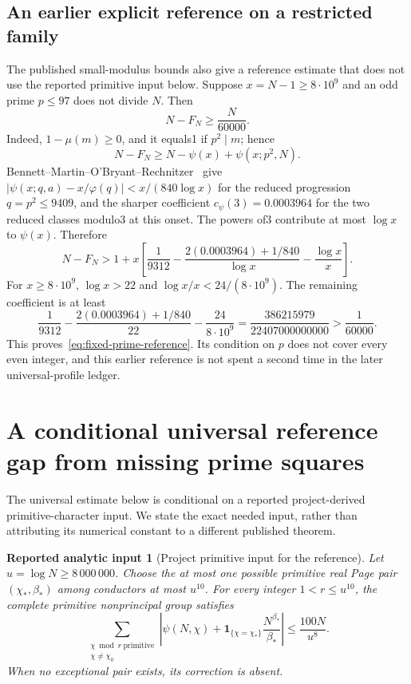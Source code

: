 \documentclass[11pt,a4paper]{article}
\newtheorem{analyticinput}[theorem]{Reported analytic input}
\theoremstyle{definition}
\theoremstyle{remark}
\begin{document}
\subsection{An earlier explicit reference on a restricted family}
The published small-modulus bounds also give a reference estimate that
does not use the reported primitive input below. Suppose $x=N-1\ge
8\cdot10^9$ and an odd prime $p\le97$ does not divide $N$. Then
\begin{equation}\label{eq:fixed-prime-reference}
 N-F_N\ge\frac{N}{60000}.
\end{equation}
Indeed, $1-\mu(m)\ge0$, and it equals1 if $p^2\mid m$; hence
\[N-F_N\ge N-\psi(x)+\psi(x;p^2,N).\]
Bennett--Martin--O'Bryant--Rechnitzer~\cite[Theorem 1.1 and Table 1]{BMOR}
give $|\psi(x;q,a)-x/\varphi(q)|<x/(840\log x)$ for the
reduced progression $q=p^2\le9409$, and the sharper coefficient
$c_\psi(3)=0.0003964$ for the two reduced classes modulo3 at this onset.
The powers of3 contribute at most $\log x$ to $\psi(x)$. Therefore
\[N-F_N>
1+x\left[\frac1{9312}
-\frac{2(0.0003964)+1/840}{\log x}-\frac{\log x}{x}\right].\]
For $x\ge8\cdot10^9$, $\log x>22$ and
$\log x/x<24/(8\cdot10^9)$. The remaining coefficient is at least
\[\frac1{9312}-\frac{2(0.0003964)+1/840}{22}
-\frac{24}{8\cdot10^9}
=\frac{386215979}{22407000000000}>\frac1{60000}.
\]
This proves~\eqref{eq:fixed-prime-reference}. Its condition on $p$
does not cover every even integer, and this earlier reference is not
spent a second time in the later universal-profile ledger.

\section{A conditional universal reference gap from missing prime squares}
\label{sec:sector-universal-reference}

The universal estimate below is conditional on a reported project-derived primitive-character
input. We state the exact needed input, rather than attributing its
numerical constant to a different published theorem.

\begin{analyticinput}[Project primitive input for the reference]
\label{lem:primitive-reference-input}
Let $u=\log N\geq8\,000\,000$.  Choose the at most one possible
primitive real Page pair $(\chi_*,\beta_*)$ among conductors at most
$u^{10}$.  For every integer $1<r\leq u^{10}$, the complete primitive
nonprincipal group satisfies
\begin{equation}
 \sum_{\substack{\chi\bmod r\ \mathrm{primitive}\\\chi\ne\chi_0}}
 \left|\psi(N,\chi)
        +\mathbf1_{\{\chi=\chi_*\}}\frac{N^{\beta_*}}{\beta_*}\right|
                    \leq \frac{100N}{u^8}.
 \label{eq:sector-primitive-reference-input}
\end{equation}
When no exceptional pair exists, its correction is absent.
\end{analyticinput}
\end{document}
